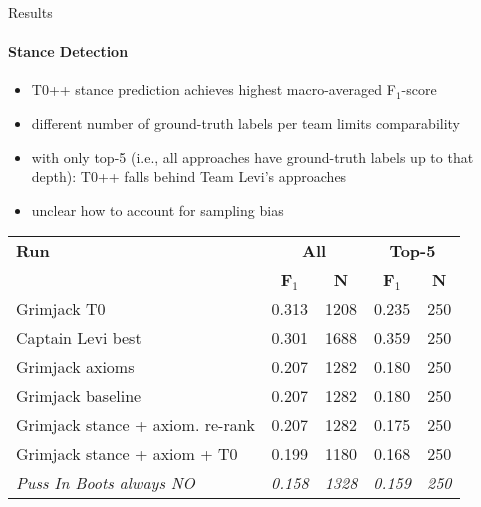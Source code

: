 \documentclass[english]{mlutalk}
\begin{document}
\begin{frame}{Results}
  \framesubtitle{Stance Detection}
  \begin{itemize}
    \item T0++ stance prediction achieves highest macro-averaged F$_1$-score
    \item different number of ground-truth labels per team limits comparability
    \item with only top-5 (i.e., all approaches have ground-truth labels up to that depth): T0++ falls behind Team Levi's approaches
    \item unclear how to account for sampling bias
  \end{itemize}
  \begin{table}[t]
    \centering
    \scriptsize
    \renewcommand{\tabcolsep}{5pt}
    \begin{tabular}{@{}lcccc@{}}
    \toprule
    \textbf{Run} & \multicolumn{2}{c}{\textbf{All}} & \multicolumn{2}{c}{\textbf{Top-5}} \\
    & \textbf{F$_1$} & \textbf{N} & \textbf{F$_1$} & \textbf{N} \\
    \midrule
    Grimjack T0 & 0.313 & 1208 & 0.235 & 250 \\
    Captain Levi best~\cite{RanaGJCEHP2022} & 0.301 & 1688 & 0.359 & 250 \\
    Grimjack axioms & 0.207 & 1282 & 0.180 & 250 \\
    Grimjack baseline & 0.207 & 1282 & 0.180 & 250 \\
    Grimjack stance + axiom. re-rank & 0.207 & 1282 & 0.175 & 250 \\
    Grimjack stance + axiom + T0 & 0.199 & 1180 & 0.168 & 250 \\
    \textit{Puss In Boots always NO}~\cite{BondarenkoFKSGBPBSWPH2022} & \textit{0.158} & \textit{1328} & \textit{0.159} & \textit{250} \\
    \bottomrule
    \end{tabular}
  \end{table}
\end{frame}
\end{document}

